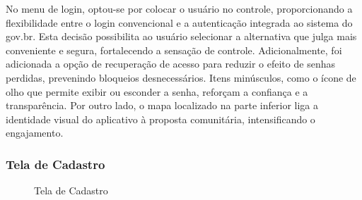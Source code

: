 \documentclass[a4paper, 12pt]{article}
\begin{document}
No menu de login, optou-se por colocar o usuário no controle, proporcionando a flexibilidade entre o login convencional e a autenticação integrada ao sistema do gov.br.  Esta decisão possibilita ao usuário selecionar a alternativa que julga mais conveniente e segura, fortalecendo a sensação de controle.  Adicionalmente, foi adicionada a opção de recuperação de acesso para reduzir o efeito de senhas perdidas, prevenindo bloqueios desnecessários.  Itens minúsculos, como o ícone de olho que permite exibir ou esconder a senha, reforçam a confiança e a transparência. Por outro lado, o mapa localizado na parte inferior liga a identidade visual do aplicativo à proposta comunitária, intensificando o engajamento.

\subsubsection{Tela de Cadastro}

\begin{figure}[H]
  \centering
  \caption{Tela de Cadastro}
  \label{fig:cadastro}
\end{figure}
\end{document}
